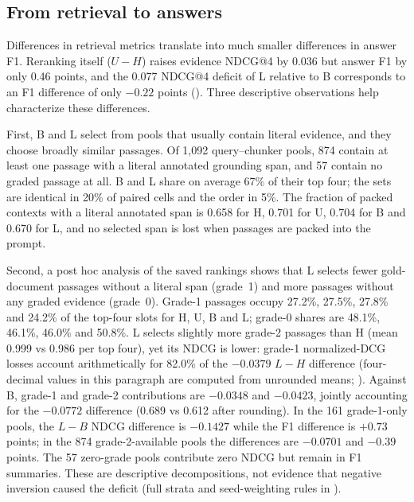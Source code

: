\subsection{From retrieval to answers}\label{sec:propagation}
Differences in retrieval metrics translate into much smaller differences in answer F1. Reranking itself ($U-H$) raises evidence NDCG@4 by 0.036 but answer F1 by only 0.46 points, and the 0.077 NDCG@4 deficit of L relative to B corresponds to an F1 difference of only $-0.22$ points (). Three descriptive observations help characterize these differences.

First, B and L select from pools that usually contain literal evidence, and they choose broadly similar passages. Of 1,092 query--chunker pools, 874 contain at least one passage with a literal annotated grounding span, and 57 contain no graded passage at all. B and L share on average 67\% of their top four; the sets are identical in 20\% of paired cells and the order in 5\%. The fraction of packed contexts with a literal annotated span is 0.658 for H, 0.701 for U, 0.704 for B and 0.670 for L, and no selected span is lost when passages are packed into the prompt.

Second, a post hoc analysis of the saved rankings shows that L selects fewer gold-document passages without a literal span (grade~1) and more passages without any graded evidence (grade~0). Grade-1 passages occupy 27.2\%, 27.5\%, 27.8\% and 24.2\% of the top-four slots for H, U, B and L; grade-0 shares are 48.1\%, 46.1\%, 46.0\% and 50.8\%. L selects slightly more grade-2 passages than H (mean 0.999 vs 0.986 per top four), yet its NDCG is lower: grade-1 normalized-DCG losses account arithmetically for 82.0\% of the $-0.0379$ $L-H$ difference (four-decimal values in this paragraph are computed from unrounded means; ). Against B, grade-1 and grade-2 contributions are $-0.0348$ and $-0.0423$, jointly accounting for the $-0.0772$ difference (0.689 vs 0.612 after rounding). In the 161 grade-1-only pools, the $L-B$ NDCG difference is $-0.1427$ while the F1 difference is $+0.73$ points; in the 874 grade-2-available pools the differences are $-0.0701$ and $-0.39$ points. The 57 zero-grade pools contribute zero NDCG but remain in F1 summaries. These are descriptive decompositions, not evidence that negative inversion caused the deficit (full strata and seed-weighting rules in ).

